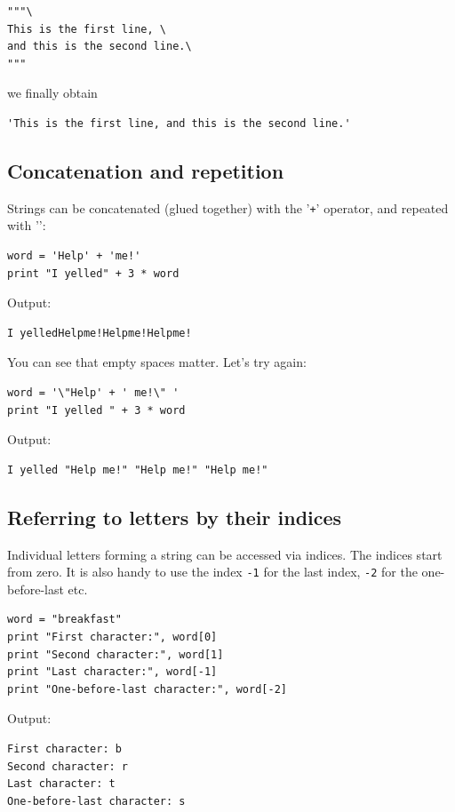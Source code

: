 \begin{verbatim}
"""\
This is the first line, \
and this is the second line.\
""" 
\end{verbatim}
we finally obtain 

\begin{verbatim}
'This is the first line, and this is the second line.'
\end{verbatim}


\subsection{Concatenation and repetition}

Strings can be concatenated (glued together) with the '{\tt +}' operator, and repeated with '{\tt *}':

\begin{verbatim}
word = 'Help' + 'me!'
print "I yelled" + 3 * word
\end{verbatim}
Output:

\begin{verbatim}
I yelledHelpme!Helpme!Helpme!
\end{verbatim}
You can see that empty spaces matter. Let's try again:

\begin{verbatim}
word = '\"Help' + ' me!\" '
print "I yelled " + 3 * word
\end{verbatim}
Output:

\begin{verbatim}
I yelled "Help me!" "Help me!" "Help me!"
\end{verbatim}

\subsection{Referring to letters by their indices}\label{subsec:ind}

Individual letters forming a string can be accessed via indices. The indices 
start from zero. It is also handy to use the index {\tt -1} 
for the last index, {\tt -2} for the one-before-last etc.

\begin{verbatim}
word = "breakfast"
print "First character:", word[0]
print "Second character:", word[1]
print "Last character:", word[-1]
print "One-before-last character:", word[-2]
\end{verbatim}
Output:

\begin{verbatim}
First character: b
Second character: r
Last character: t
One-before-last character: s
\end{verbatim}

